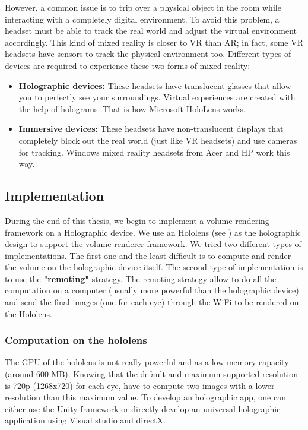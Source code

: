 However, a common issue is to trip over a physical object in the room while interacting with a completely digital environment.
To avoid this problem, a headset must be able to track the real world and adjust the virtual environment accordingly. This kind of mixed reality is closer to VR than AR; in fact, some VR headsets have sensors to track the physical environment too. Different types of devices are required to experience these two forms of mixed reality:

\begin{itemize}
 \item \textbf{ Holographic devices: } These headsets have translucent glasses that allow you to perfectly see your surroundings. Virtual experiences are created with the help of holograms. That is how Microsoft HoloLens works.
 
 \item \textbf{ Immersive devices:} These headsets have non-translucent displays that completely block out the real world (just like VR headsets) and use cameras for tracking. Windows mixed reality headsets from Acer and HP work this way.

\end{itemize}

\subsection{Implementation}

During the end of this thesis, we begin to implement a volume rendering framework on a Holographic device. We use an Hololens (see \cite{hololens}) as the holographic design to support the volume renderer framework. We tried two different types of implementations. The first one and the least difficult is to compute and render the volume on the holographic device itself. The second type of implementation is to use the \textbf{ "remoting" } strategy. The remoting strategy allow to do all the computation on a computer (usually more powerful than the holographic device) and send the final images (one for each eye) through the WiFi to be rendered on the Hololens.

\subsubsection{Computation on the hololens}

The GPU of the hololens is not really powerful and as a low memory capacity (around 600 MB).  Knowing that the default and maximum supported resolution is 720p (1268x720) for each eye, have to compute two images with a lower resolution than this maximum value.  To develop an holographic app, one can either use the Unity framework or directly develop an universal holographic application using Visual studio and directX.


